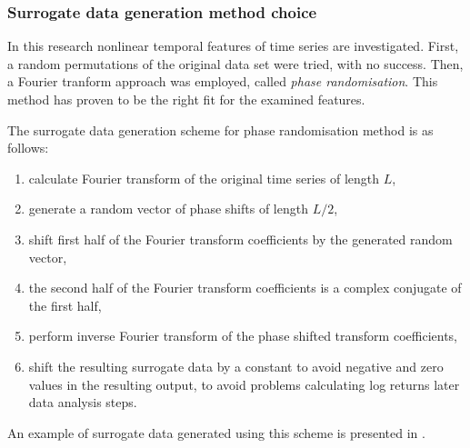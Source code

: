 \newpage
\subsubsection{Surrogate data generation method choice} \label{sec:surrogate-method}
In this research nonlinear temporal features of time series are investigated.
First, a random permutations of the original data set were tried, with no success.
Then, a Fourier tranform approach was employed, called \emph{phase randomisation}.
This method has proven to be the right fit for the examined features.

The surrogate data generation scheme for phase randomisation method is as follows:
\begin{enumerate}
    \item calculate Fourier transform of the original time series of length $L$,
    \item generate a random vector of phase shifts of length $L/2$,
    \item shift first half of the Fourier transform coefficients by the generated random vector,
    \item the second half of the Fourier transform coefficients is a complex conjugate of the first half,
    \item perform inverse Fourier transform of the phase shifted transform coefficients,
    \item shift the resulting surrogate data by a constant to avoid negative and zero values in the resulting output, to avoid problems calculating log returns later data analysis steps.
\end{enumerate}

An example of surrogate data generated using this scheme is presented in .
